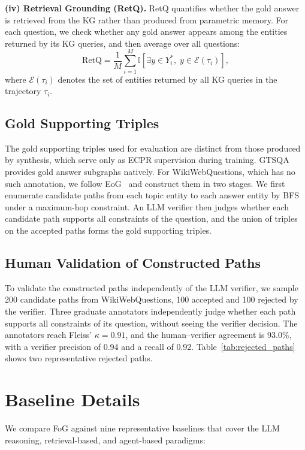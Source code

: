 \textbf{(iv) Retrieval Grounding (RetQ).}
RetQ quantifies whether the gold answer is retrieved from the KG rather than produced from parametric memory. For each question, we check whether any gold answer appears among the entities returned by its KG queries, and then average over all questions:
\begin{equation}
    \mathrm{RetQ} = \frac{1}{M}\sum_{i=1}^{M}
        \mathbb{I}\!\left[\exists y \in Y_i^{*},\; y \in \mathcal{E}(\tau_i)\right],
\end{equation}
where $\mathcal{E}(\tau_i)$ denotes the set of entities returned by all KG queries in the trajectory $\tau_i$.

\subsection{Gold Supporting Triples}
\label{app:gold_supporting_triples}
The gold supporting triples used for evaluation are distinct from those produced by synthesis, which serve only as ECPR supervision during training. GTSQA provides gold answer subgraphs natively. For WikiWebQuestions, which has no such annotation, we follow EoG~\cite{EoG} and construct them in two stages. We first enumerate candidate paths from each topic entity to each answer entity by BFS under a maximum-hop constraint. An LLM verifier then judges whether each candidate path supports all constraints of the question, and the union of triples on the accepted paths forms the gold supporting triples.

\subsection{Human Validation of Constructed Paths}
\label{app:human_audit}

To validate the constructed paths independently of the LLM verifier, we sample 200 candidate paths from WikiWebQuestions, 100 accepted and 100 rejected by the verifier. Three graduate annotators independently judge whether each path supports all constraints of its question, without seeing the verifier decision. The annotators reach Fleiss' $\kappa=0.91$, and the human--verifier agreement is 93.0\%, with a verifier precision of 0.94 and a recall of 0.92. Table~\ref{tab:rejected_paths} shows two representative rejected paths.

\section{Baseline Details}
\label{app:baselines}
We compare FoG against nine representative baselines that cover the LLM reasoning, retrieval-based, and agent-based paradigms:

